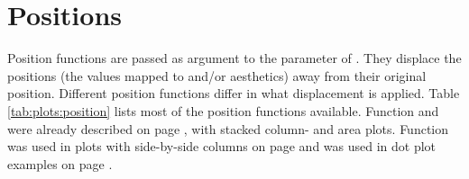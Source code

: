 \documentclass[krantz2]{krantz}\usepackage{knitr}
\begin{document}

\section{Positions}\label{sec:plot:positions}



Position functions are passed as argument to the  parameter of . They displace the positions (the values mapped to  and/or  aesthetics) away from their original position. Different position functions differ in what displacement is applied. Table \ref{tab:plots:position} lists most of the position functions available. Function  and  were already described on page \pageref{par:plot:pos:stack}, with stacked column- and area plots. Function  was used in plots with side-by-side columns on page \pageref{par:plot:pos:dodge} and  was used in dot plot examples on page \pageref{par:plot:pos:jitter}.
\end{document}
